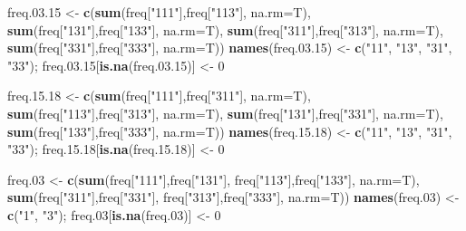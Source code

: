\documentclass[a4paper, notitlepage, 12pt, krantz2]{krantz}
\newenvironment{Shaded}{\begin{snugshade}}{\end{snugshade}}
\newcommand{\DataTypeTok}[1]{\textcolor[rgb]{0.13,0.29,0.53}{#1}}
\newcommand{\DecValTok}[1]{\textcolor[rgb]{0.00,0.00,0.81}{#1}}
\newcommand{\FloatTok}[1]{\textcolor[rgb]{0.00,0.00,0.81}{#1}}
\newcommand{\KeywordTok}[1]{\textcolor[rgb]{0.13,0.29,0.53}{\textbf{#1}}}
\newcommand{\NormalTok}[1]{#1}
\newcommand{\StringTok}[1]{\textcolor[rgb]{0.31,0.60,0.02}{#1}}
\begin{document}
\begin{Shaded}
\begin{Highlighting}[]
\NormalTok{freq.}\FloatTok{03.15}\NormalTok{        <-}\StringTok{ }\KeywordTok{c}\NormalTok{(}\KeywordTok{sum}\NormalTok{(freq[}\StringTok{"111"}\NormalTok{],freq[}\StringTok{"113"}\NormalTok{], }\DataTypeTok{na.rm=}\NormalTok{T), }\KeywordTok{sum}\NormalTok{(freq[}\StringTok{"131"}\NormalTok{],freq[}\StringTok{"133"}\NormalTok{], }\DataTypeTok{na.rm=}\NormalTok{T),}
                       \KeywordTok{sum}\NormalTok{(freq[}\StringTok{"311"}\NormalTok{],freq[}\StringTok{"313"}\NormalTok{], }\DataTypeTok{na.rm=}\NormalTok{T), }\KeywordTok{sum}\NormalTok{(freq[}\StringTok{"331"}\NormalTok{],freq[}\StringTok{"333"}\NormalTok{], }\DataTypeTok{na.rm=}\NormalTok{T))}
\KeywordTok{names}\NormalTok{(freq.}\FloatTok{03.15}\NormalTok{) <-}\StringTok{ }\KeywordTok{c}\NormalTok{(}\StringTok{"11"}\NormalTok{, }\StringTok{"13"}\NormalTok{, }\StringTok{"31"}\NormalTok{, }\StringTok{"33"}\NormalTok{); freq.}\FloatTok{03.15}\NormalTok{[}\KeywordTok{is.na}\NormalTok{(freq.}\FloatTok{03.15}\NormalTok{)] <-}\StringTok{ }\DecValTok{0}

\NormalTok{freq.}\FloatTok{15.18}\NormalTok{        <-}\StringTok{ }\KeywordTok{c}\NormalTok{(}\KeywordTok{sum}\NormalTok{(freq[}\StringTok{"111"}\NormalTok{],freq[}\StringTok{"311"}\NormalTok{], }\DataTypeTok{na.rm=}\NormalTok{T), }\KeywordTok{sum}\NormalTok{(freq[}\StringTok{"113"}\NormalTok{],freq[}\StringTok{"313"}\NormalTok{], }\DataTypeTok{na.rm=}\NormalTok{T),}
                       \KeywordTok{sum}\NormalTok{(freq[}\StringTok{"131"}\NormalTok{],freq[}\StringTok{"331"}\NormalTok{], }\DataTypeTok{na.rm=}\NormalTok{T), }\KeywordTok{sum}\NormalTok{(freq[}\StringTok{"133"}\NormalTok{],freq[}\StringTok{"333"}\NormalTok{], }\DataTypeTok{na.rm=}\NormalTok{T))}
\KeywordTok{names}\NormalTok{(freq.}\FloatTok{15.18}\NormalTok{) <-}\StringTok{ }\KeywordTok{c}\NormalTok{(}\StringTok{"11"}\NormalTok{, }\StringTok{"13"}\NormalTok{, }\StringTok{"31"}\NormalTok{, }\StringTok{"33"}\NormalTok{); freq.}\FloatTok{15.18}\NormalTok{[}\KeywordTok{is.na}\NormalTok{(freq.}\FloatTok{15.18}\NormalTok{)] <-}\StringTok{ }\DecValTok{0}

\NormalTok{freq}\FloatTok{.03}\NormalTok{           <-}\StringTok{ }\KeywordTok{c}\NormalTok{(}\KeywordTok{sum}\NormalTok{(freq[}\StringTok{"111"}\NormalTok{],freq[}\StringTok{"131"}\NormalTok{], freq[}\StringTok{"113"}\NormalTok{],freq[}\StringTok{"133"}\NormalTok{], }\DataTypeTok{na.rm=}\NormalTok{T),}
                       \KeywordTok{sum}\NormalTok{(freq[}\StringTok{"311"}\NormalTok{],freq[}\StringTok{"331"}\NormalTok{], freq[}\StringTok{"313"}\NormalTok{],freq[}\StringTok{"333"}\NormalTok{], }\DataTypeTok{na.rm=}\NormalTok{T))}
\KeywordTok{names}\NormalTok{(freq}\FloatTok{.03}\NormalTok{)    <-}\StringTok{ }\KeywordTok{c}\NormalTok{(}\StringTok{"1"}\NormalTok{, }\StringTok{"3"}\NormalTok{); freq}\FloatTok{.03}\NormalTok{[}\KeywordTok{is.na}\NormalTok{(freq}\FloatTok{.03}\NormalTok{)] <-}\StringTok{ }\DecValTok{0}
  

\end{Highlighting}
\end{Shaded}
\end{document}
